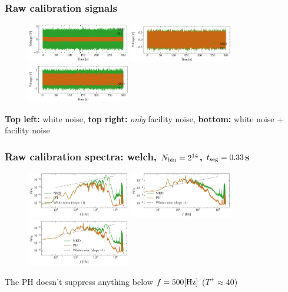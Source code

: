 \documentclass[aspectratio=169,9pt]{beamer}
\begin{document}
\begin{frame}
  \frametitle{Raw calibration signals}
  \begin{figure}
    \centering
    \includegraphics[width=0.4\textwidth]{sanity/50psi/PH-NKD/calib_ts_signals_50psi_nonoise.pdf}
    \includegraphics[width=0.4\textwidth]{sanity/50psi/PH-NKD/calib_ts_signals_50psi_noise.pdf}
    \includegraphics[width=0.4\textwidth]{sanity/50psi/PH-NKD/calib_ts_signals_50psi_noiseWN.pdf}
  \end{figure}
  \centering
  \textbf{Top left:} white noise, \textbf{top right:} \emph{only} facility noise, \textbf{bottom:} white noise + facility noise
\end{frame}

\begin{frame}
  \frametitle{Raw calibration spectra: welch, $N_{\rm bin}=2^{14}$, $t_{\rm seg}=0.33$s}
  \begin{figure}
    \centering
    \includegraphics[width=0.4\textwidth]{sanity/50psi/PH-NKD/calib_spectra_50psi_nonoise.pdf}
    \includegraphics[width=0.4\textwidth]{sanity/50psi/PH-NKD/calib_spectra_50psi_noise.pdf}
    \includegraphics[width=0.4\textwidth]{sanity/50psi/PH-NKD/calib_spectra_50psi_noiseWN.pdf}
  \end{figure}
  
  \centering
  The PH doesn't suppress anything below $f = 500[\rm Hz]$ ($T^+ \approx 40$)
\end{frame}
\end{document}
